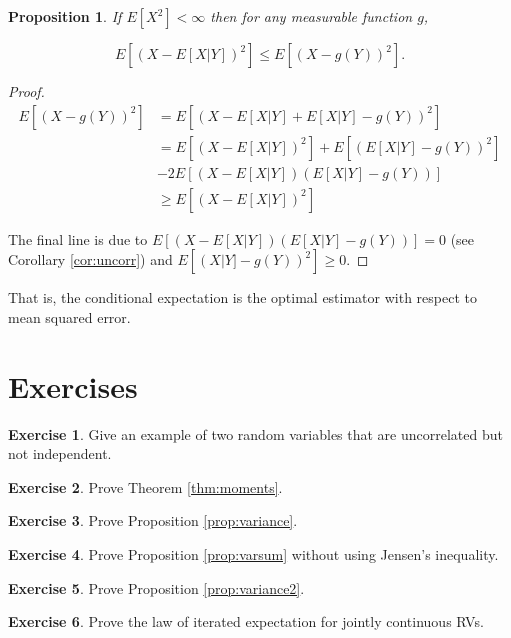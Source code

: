 \documentclass{book}
\theoremstyle{plain}%
\newtheorem{proposition}{Proposition}[section]
\theoremstyle{definition}
\newtheorem{exercise}{Exercise}[chapter]
\begin{document}
\begin{proposition}
If $E[X^2] < \infty$ then for any measurable function $g$,

$$E[(X - E[X|Y])^2] \leq E[(X - g(Y))^2].$$
\end{proposition}
\begin{proof}

\begin{align*}
    E[(X - g(Y))^2] &= E[(X - E[X|Y] + E[X|Y] - g(Y))^2]\\
    &= E[(X - E[X|Y])^2] + E[(E[X|Y] - g(Y))^2] \\
    &- 2E[(X - E[X|Y])(E[X|Y] - g(Y))]\\
    &\geq  E[(X - E[X|Y])^2]
\end{align*}

The final line is due to $E[(X - E[X|Y])(E[X|Y] - g(Y))] = 0$ (see Corollary \ref{cor:uncorr}) and $E[(X|Y] - g(Y))^2] \geq 0$.
\end{proof}

That is, the conditional expectation is the optimal estimator with respect to mean squared error.

\section*{Exercises}

\begin{exercise}
Give an example of two random variables that are uncorrelated but not independent.
\end{exercise}

\begin{exercise}
Prove Theorem \ref{thm:moments}.
\end{exercise}

\begin{exercise}
Prove Proposition \ref{prop:variance}.
\end{exercise}

\begin{exercise}
Prove Proposition \ref{prop:varsum} without using Jensen's inequality.
\end{exercise}

\begin{exercise}
Prove Proposition \ref{prop:variance2}.
\end{exercise}

\begin{exercise}
Prove the law of iterated expectation for jointly continuous RVs.
\end{exercise}
\end{document}

